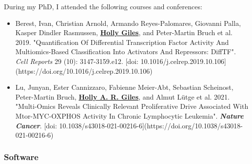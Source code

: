 \documentclass[11pt, a4paper, twosided]{book}
\begin{document}
    During my PhD, I attended the following courses and conferences:
    \begin{itemize}
      \item Berest, Ivan\ast, Christian Arnold\ast, Armando Reyes-Palomares, Giovanni Palla, Kasper Dindler Rasmussen, \textbf{\underline{Holly Giles}}, and Peter-Martin Bruch et al. 2019. "Quantification Of Differential Transcription Factor Activity And Multiomics-Based Classification Into Activators And Repressors: DiffTF". \textit{Cell Reports} 29 (10): 3147-3159.e12. [doi: 10.1016/j.celrep.2019.10.106](https://doi.org/10.1016/j.celrep.2019.10.106)
      \item Lu, Junyan\ast, Ester Cannizzaro\ast, Fabienne Meier-Abt, Sebastian Scheinost, Peter-Martin Bruch, \textbf{\underline{Holly A. R. Giles}}, and Almut Lütge et al. 2021. "Multi-Omics Reveals Clinically Relevant Proliferative Drive Associated With Mtor-MYC-OXPHOS Activity In Chronic Lymphocytic Leukemia". \textbf{\textit{Nature Cancer}}. [doi: 10.1038/s43018-021-00216-6](https://doi.org/10.1038/s43018-021-00216-6)
    \end{itemize}
    \hypertarget{software}{%
    \subsubsection*{Software}\label{software}}
\end{document}
